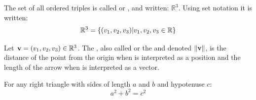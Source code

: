 \begin{defn}
	The set of all ordered triples is called  or , and written: $\mathbb{R}^3$. Using set notation it is written: \[ \mathbb{R}^3=\{({v_1},{v_2},{v_3}) | v_1,v_2,v_3 \in \mathbb{R}\} \] 
\end{defn}

\begin{defn}
	Let $\mathbf{v}=({v_1},{v_2},{v_3}) \in \mathbb{R}^3$. The , also called  or the  and denoted $\|\mathbf{v}\|$, is the distance of the point from the origin when  is interpreted as a position and the length of the arrow when  is interpreted as a vector.
\end{defn}

\begin{pyth}
	For any right triangle with sides of length $a$ and $b$ and hypotenuse $c$: \[a^2+b^2 = c^2\]
\end{pyth}
\vspace{-.3in}\hspace{5in}\begin{annotation}
\end{annotation}

